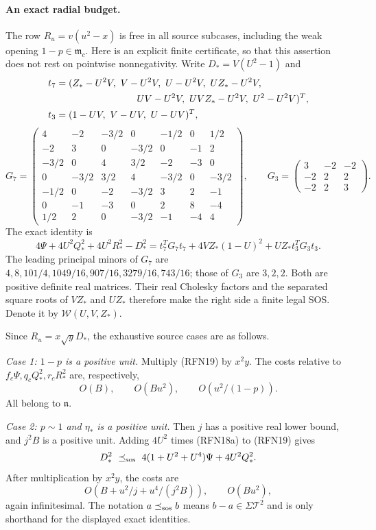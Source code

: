 \paragraph{An exact radial budget.}
The row $R_u=v(u^2-x)$ is free in all source subcases, including the
weak opening $1-p\in\mathfrak m_c$.  Here is an explicit finite
certificate, so that this assertion does not rest on pointwise
nonnegativity.  Write $D_*=V(U^2-1)$ and
\[
\begin{split}
 t_7={}&(Z_*-U^2V,\ V-U^2V,\ U-U^2V,\ UZ_*-U^2V,\\
       &\hspace{25mm}UV-U^2V,\ UVZ_*-U^2V,\ U^2-U^2V)^T,\\
 t_3={}&(1-UV,\ V-UV,\ U-UV)^T,
\end{split}
\]
\[
 G_7=\begin{pmatrix}
 4&-2&-3/2&0&-1/2&0&1/2\\
 -2&3&0&-3/2&0&-1&2\\
 -3/2&0&4&3/2&-2&-3&0\\
 0&-3/2&3/2&4&-3/2&0&-3/2\\
 -1/2&0&-2&-3/2&3&2&-1\\
 0&-1&-3&0&2&8&-4\\
 1/2&2&0&-3/2&-1&-4&4
 \end{pmatrix},\qquad
 G_3=\begin{pmatrix}3&-2&-2\\-2&2&2\\-2&2&3\end{pmatrix}.
\]
The exact identity is
\[
 4\Psi+4U^2Q_*^2+4U^2R_*^2-D_*^2
   =t_7^TG_7t_7+4VZ_*(1-U)^2+UZ_*t_3^TG_3t_3.         \tag{RFN19}
\]
The leading principal minors of $G_7$ are
$4,8,101/4,1049/16,907/16,3279/16,743/16$; those of $G_3$ are
$3,2,2$.  Both are positive definite real matrices.  Their real
Cholesky factors and the separated square roots of $VZ_*$ and $UZ_*$
therefore make the right side a finite legal SOS.  Denote it by
$\mathcal W(U,V,Z_*)$.

Since $R_u=x\sqrt y D_*$, the exhaustive source cases are as follows.

\emph{Case 1: $1-p$ is a positive unit.}
Multiply (RFN19) by $x^2y$.  The costs relative to
$f_c\Psi,q_cQ_*^2,r_cR_*^2$ are, respectively,
\[
 O(B),\qquad O(Bu^2),\qquad O(u^2/(1-p)).
\]
All belong to $\mathfrak n$.

\emph{Case 2: $p\sim1$ and $\eta_*$ is a positive unit.}
Then $j$ has a positive real lower bound, and $j^2B$ is a positive
unit.  Adding $4U^2$ times (RFN18a) to (RFN19) gives
\[
 D_*^2\ \preceq_{\rm sos}\
 4(1+U^2+U^4)\Psi+4U^2Q_*^2.
\]
After multiplication by $x^2y$, the costs are
\[
 O\!\left(B+u^2/j+u^4/(j^2B)\right),\qquad O(Bu^2),
\]
again infinitesimal.  The notation $a\preceq_{\rm sos}b$ means
$b-a\in\Sigma\mathcal T^2$ and is only shorthand for the displayed
exact identities.

